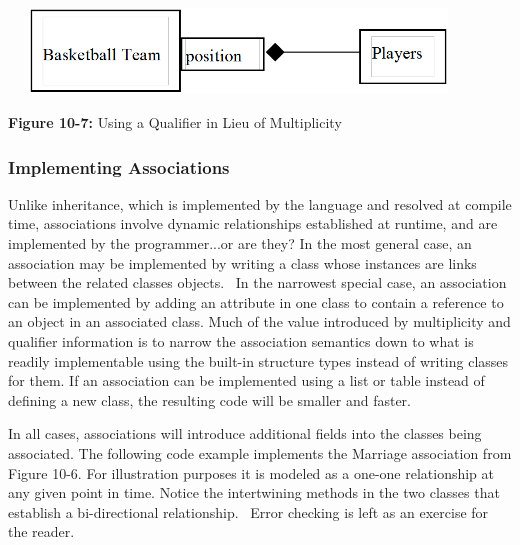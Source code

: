 \bigskip

\includegraphics[width=4.8in,height=0.9in]{ub-img/qualifier.png}

{\sffamily\bfseries Figure 10-7:}
{\sffamily Using a Qualifier in Lieu of Multiplicity}

\bigskip

\subsubsection{Implementing Associations}
Unlike inheritance, which is implemented by the language and resolved at
compile time, associations involve dynamic
relationships established at runtime, and are implemented by the
programmer...or are they? In the most general case, an association may
be implemented by writing a class whose instances are links between the
related classes{\textquotesingle} objects. \ In the narrowest special
case, an association can be implemented by adding an attribute in one
class to contain a reference to an object in an
associated class. Much of the value introduced by multiplicity and
qualifier information is to narrow the association semantics down to
what is readily implementable using the built-in structure types
instead of writing classes for them. If an association can be
implemented using a list or table instead of defining a new class, the
resulting code will be smaller and faster.

In all cases, associations will introduce additional fields into the
classes being associated. The following code example implements the
Marriage association from Figure 10-6. For illustration purposes it is
modeled as a one-one relationship at any given point in time. Notice
the intertwining methods in the two classes that establish a
bi-directional relationship. \ Error checking is left as an exercise
for the reader.


